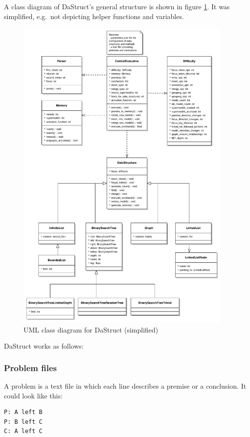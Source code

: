 \documentclass[hidelinks]{scrartcl}
\begin{document}
A class diagram of DaStruct's general structure is shown in figure \ref{img:UML}. It was simplified, e.g.\ not depicting helper functions and variables.
\begin{figure}[H]
	\caption{UML class diagram for DaStruct (simplified)}
	\label{img:UML}
	\centering
	\includegraphics[width=0.95\textwidth]{Illustrations/UML_class_diagram_DaStruct.pdf}
\end{figure}

\noindent DaStruct works as follows: 

\subsubsection{Problem files}
A problem is a text file in which each line describes a premise or a conclusion. It could look like this: 

\begin{lstlisting}[caption=A sample problem file, frame=single]
P: A left B
P: B left C
C: A left C
\end{lstlisting} 
\end{document}
